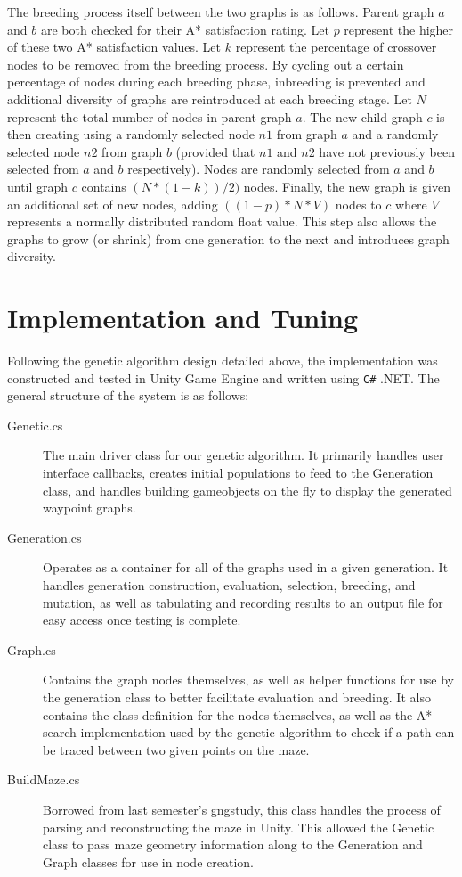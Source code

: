 	The breeding process itself between the two graphs is as follows. Parent graph \(a\) and \(b\) are both checked for their A* satisfaction rating. Let \(p\) represent the higher of these two A* satisfaction values. Let \(k\) represent the percentage of crossover nodes to be removed from the breeding process. By cycling out a certain percentage of nodes during each breeding phase, inbreeding is prevented and additional diversity of graphs are reintroduced at each breeding stage. Let \(N\) represent the total number of nodes in parent graph \(a\). The new child graph \(c\) is then creating using a randomly selected node \(n1\) from graph \(a\) and a randomly selected node \(n2\) from graph \(b\) (provided that \(n1\) and \(n2\) have not previously been selected from \(a\) and \(b\) respectively). Nodes are randomly selected from \(a\) and \(b\) until graph \(c\) contains \((N*(1-k))/2)\) nodes. Finally, the new graph is given an additional set of new nodes, adding \(((1-p)*N * V)\) nodes to \(c\) where \(V\) represents a normally distributed random float value. This step also allows the graphs to grow (or shrink) from one generation to the next and introduces graph diversity.

\section{Implementation and Tuning}

	Following the genetic algorithm design detailed above, the implementation was constructed and tested in Unity Game Engine and written using \texttt{C\#} .NET. The general structure of the system is as follows:	
	\begin{description}
		\item[Genetic.cs] The main driver class for our genetic algorithm. It primarily handles user interface callbacks, creates initial populations to feed to the Generation class, and handles building gameobjects on the fly to display the generated waypoint graphs.
		\item[Generation.cs] Operates as a container for all of the graphs used in a given generation. It handles generation construction, evaluation, selection, breeding, and mutation, as well as tabulating and recording results to an output file for easy access once testing is complete.
		\item[Graph.cs] Contains the graph nodes themselves, as well as helper functions for use by the generation class to better facilitate evaluation and breeding. It also contains the class definition for the nodes themselves, as well as the A* search implementation used by the genetic algorithm to check if a path can be traced between two given points on the maze.
		\item[BuildMaze.cs] Borrowed from last semester's gngstudy, this class handles the process of parsing and reconstructing the maze in Unity. This allowed the Genetic class to pass maze geometry information along to the Generation and Graph classes for use in node creation.
	\end{description}
	
